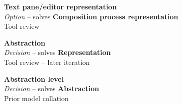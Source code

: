 \textbf{Text pane/editor representation} \\ \emph{Option} -- solves \textbf{Composition process representation} \\ Tool review

\textbf{Abstraction} \\ \emph{Decision} -- solves \textbf{Representation} \\ Tool review  -- later iteration

\textbf{Abstraction level} \\ \emph{Decision} -- solves \textbf{Abstraction} \\ Prior model collation \cite{Grammel2010}



